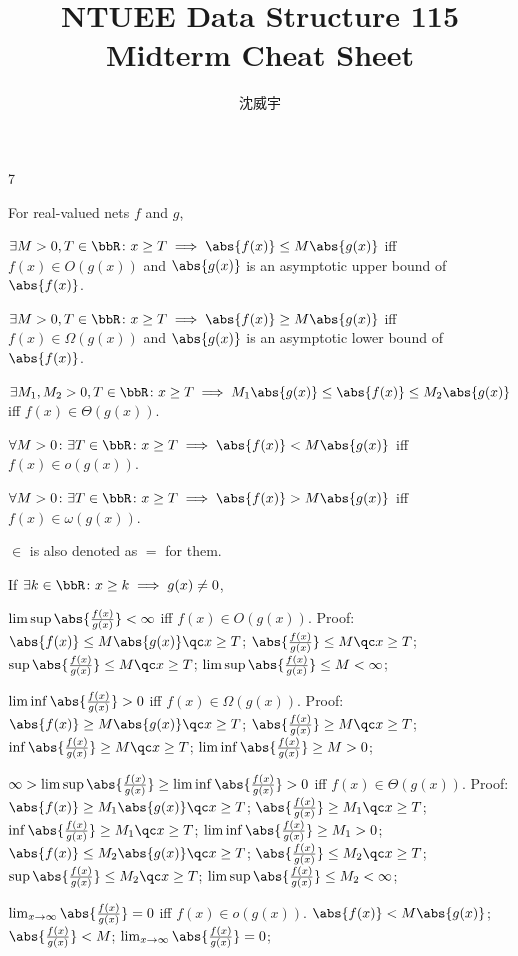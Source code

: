 \documentclass[a4paper,10pt]{extarticle}
\title{NTUEE Data Structure 115 Midterm Cheat Sheet}
\author{沈威宇}
\date{\temtoday}
\begin{document}
\temdoc
\fontsize{5pt}{6pt}\selectfont
\begin{multicols}{7}


For real-valued nets $f$ and $g$,

$\exists M>0,T\in\bbR\colon x\ge T\implies\abs{f(x)}\le M\abs{g(x)}$ iff $f(x)\in O(g(x))$ and $\abs{g(x)}$ is an asymptotic upper bound of $\abs{f(x)}$.

$\exists M>0,T\in\bbR\colon x\ge T\implies\abs{f(x)}\ge M\abs{g(x)}$ iff $f(x)\in \Omega(g(x))$ and $\abs{g(x)}$ is an asymptotic lower bound of $\abs{f(x)}$.

$\exists M_1,M_2>0,T\in\bbR\colon x\ge T\implies M_1\abs{g(x)}\le\abs{f(x)}\le M_2\abs{g(x)}$ iff $f(x)\in \Theta(g(x))$.

$\forall M>0\colon\exists T\in\bbR\colon x\ge T\implies\abs{f(x)}<M\abs{g(x)}$ iff $f(x)\in o(g(x))$.

$\forall M>0\colon\exists T\in\bbR\colon x\ge T\implies\abs{f(x)}>M\abs{g(x)}$ iff $f(x)\in \omega(g(x))$.

$\in$ is also denoted as $=$ for them.


If $\exists k\in\bbR\colon x\ge k\implies g(x)\ne0$,

$\limsup\abs{\frac{f(x)}{g(x)}}<\infty$ iff $f(x)\in O(g(x))$.
Proof:
\(\abs{f(x)}\le M\abs{g(x)}\qc x\ge T\); 
\(\abs{\frac{f(x)}{g(x)}}\le M\qc x\ge T\); 
\(\sup\abs{\frac{f(x)}{g(x)}}\le M\qc x\ge T\); 
\(\limsup\abs{\frac{f(x)}{g(x)}}\le M<\infty\); 


$\liminf\abs{\frac{f(x)}{g(x)}}>0$ iff $f(x)\in \Omega(g(x))$.
Proof:
\(\abs{f(x)}\ge M\abs{g(x)}\qc x\ge T\); 
\(\abs{\frac{f(x)}{g(x)}}\ge M\qc x\ge T\); 
\(\inf\abs{\frac{f(x)}{g(x)}}\ge M\qc x\ge T\); 
\(\liminf\abs{\frac{f(x)}{g(x)}}\ge M>0\); 


$\infty>\limsup\abs{\frac{f(x)}{g(x)}}\ge\liminf\abs{\frac{f(x)}{g(x)}}>0$ iff $f(x)\in \Theta(g(x))$.
Proof:
\(\abs{f(x)}\ge M_1\abs{g(x)}\qc x\ge T\); 
\(\abs{\frac{f(x)}{g(x)}}\ge M_1\qc x\ge T\); 
\(\inf\abs{\frac{f(x)}{g(x)}}\ge M_1\qc x\ge T\); 
\(\liminf\abs{\frac{f(x)}{g(x)}}\ge M_1>0\); 
\(\abs{f(x)}\le M_2\abs{g(x)}\qc x\ge T\); 
\(\abs{\frac{f(x)}{g(x)}}\le M_2\qc x\ge T\); 
\(\sup\abs{\frac{f(x)}{g(x)}}\le M_2\qc x\ge T\); 
\(\limsup\abs{\frac{f(x)}{g(x)}}\le M_2<\infty\); 


$\lim_{x\to\infty}\abs{\frac{f(x)}{g(x)}}=0$ iff $f(x)\in o(g(x))$.
\(\abs{f(x)}<M\abs{g(x)}\); 
\(\abs{\frac{f(x)}{g(x)}}<M\); 
\(\lim_{x\to\infty}\abs{\frac{f(x)}{g(x)}}=0\); 


\end{multicols}
\end{document}
